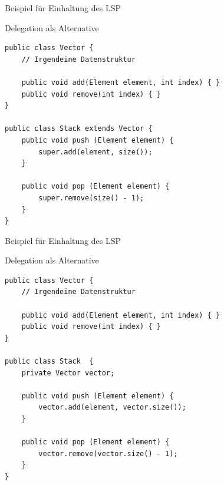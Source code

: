 \begin{frame}[fragile]{Beispiel für Einhaltung des LSP}
	\begin{alertblock}{Delegation als Alternative}
        \begin{lstlisting}
public class Vector {
    // Irgendeine Datenstruktur

    public void add(Element element, int index) { }
    public void remove(int index) { }
}
        
public class Stack extends Vector {
    public void push (Element element) {
        super.add(element, size());
    }

    public void pop (Element element) {
        super.remove(size() - 1);
    }
}
        \end{lstlisting} 		
 	\end{alertblock}
\end{frame}

\begin{frame}[fragile]{Beispiel für Einhaltung des LSP}
	\begin{exampleblock}{Delegation als Alternative}
        \begin{lstlisting}
public class Vector {
    // Irgendeine Datenstruktur

    public void add(Element element, int index) { }
    public void remove(int index) { }
}
        
public class Stack  {
    private Vector vector;

    public void push (Element element) {
        vector.add(element, vector.size());
    }

    public void pop (Element element) {
        vector.remove(vector.size() - 1);
    }
}
        \end{lstlisting} 		
 	\end{exampleblock}
\end{frame}


